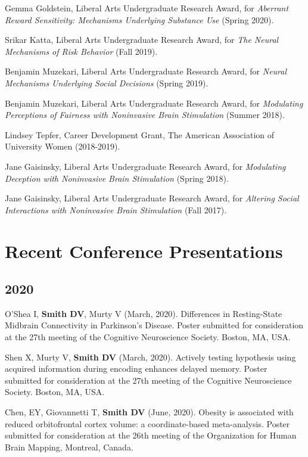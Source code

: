 \documentclass[11pt, letterpaper]{article}
\begin{document}
\begin{hangparas}{.5in}{1}

Gemma Goldstein, Liberal Arts Undergraduate Research Award, for \textit{Aberrant Reward Sensitivity: Mechanisms Underlying Substance Use} (Spring 2020). 

Srikar Katta, Liberal Arts Undergraduate Research Award, for \textit{The Neural Mechanisms of Risk Behavior} (Fall 2019).

Benjamin Muzekari, Liberal Arts Undergraduate Research Award, for \textit{Neural Mechanisms Underlying Social Decisions} (Spring 2019).

Benjamin Muzekari, Liberal Arts Undergraduate Research Award, for \textit{Modulating Perceptions of Fairness with Noninvasive Brain Stimulation} (Summer 2018).

Lindsey Tepfer, Career Development Grant, The American Association of University Women (2018-2019).

Jane Gaisinsky, Liberal Arts Undergraduate Research Award, for \textit{Modulating Deception with Noninvasive Brain Stimulation} (Spring 2018).

Jane Gaisinsky, Liberal Arts Undergraduate Research Award, for \textit{Altering Social Interactions with Noninvasive Brain Stimulation} (Fall 2017). \\

\end{hangparas}



\vspace{.2cm}

\section*{Recent Conference Presentations}

\subsection*{2020}
\begin{hangparas}{.5in}{1}

O'Shea I, \textbf{Smith DV}, Murty V (March, 2020). Differences in Resting-State Midbrain Connectivity in Parkinson’s Disease. Poster submitted for consideration at the 27th meeting of the Cognitive Neuroscience Society. Boston, MA, USA.

Shen X, Murty V, \textbf{Smith DV} (March, 2020). Actively testing hypothesis using acquired information during encoding enhances delayed memory. Poster submitted for consideration at the 27th meeting of the Cognitive Neuroscience Society. Boston, MA, USA.

Chen, EY, Giovannetti T, \textbf{Smith DV} (June, 2020). Obesity is associated with reduced orbitofrontal cortex volume: a coordinate-based meta-analysis. Poster submitted for consideration at the 26th meeting of the Organization for Human Brain Mapping, Montreal, Canada.  \\

\end{hangparas}
\end{document}

